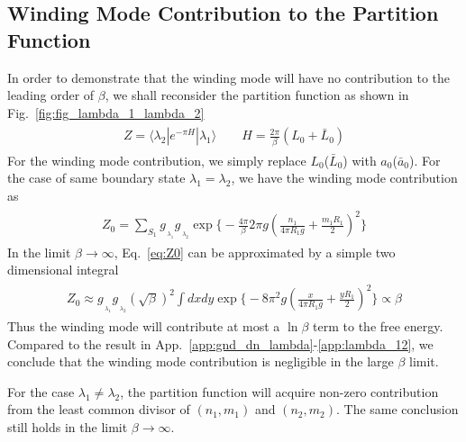 \subsection{Winding Mode Contribution to the Partition Function}
\label{app_sub:winding_contribution}
In order to demonstrate that the winding mode will have no contribution to the leading order of $\beta$, we shall reconsider the partition function as shown in Fig.~\ref{fig:fig_lambda_1_lambda_2}
\begin{eqnarray}\begin{aligned}
Z=\langle\lambda_2|e^{-\pi H}|\lambda_1\rangle\qquad H=\frac{2\pi}{\beta}(L_0+\bar{L}_0)
\end{aligned}\end{eqnarray}
For the winding mode contribution, we simply replace $L_0$($\bar{L}_0$) with $a_0$($\bar{a}_0$). For the case of same boundary state $\lambda_1=\lambda_2$, we have the winding mode contribution as
\begin{eqnarray}\begin{aligned}
\label{eq:Z0}
Z_0 = \sum_{S_1 } g_{\,\!_{\lambda_1} }g_{\,\!_{\lambda_2} } \exp\Big\{- \frac{4\pi}{\beta} 2 \pi g ( \frac{n_1}{ 4 \pi R_1 g} + \frac{m_1 R_1 }{ 2} )^2 \Big\}
\end{aligned}\end{eqnarray}
In the limit $\beta\rightarrow\infty$, Eq.~\eqref{eq:Z0} can be approximated by a simple two dimensional integral
\begin{eqnarray}\begin{aligned}
Z_0\approx g_{\,\!_{\lambda_1} }g_{\,\!_{\lambda_2} } (\sqrt{\beta})^2\int dxdy\exp\Big\{-8 \pi^2 g ( \frac{x}{ 4 \pi R_1 g} + \frac{y R_1 }{ 2} )^2 \Big\}\propto\beta
\end{aligned}\end{eqnarray}
Thus the winding mode will contribute at most a $\ln\beta$ term to the free energy. Compared to the result in App.~\ref{app:gnd_dn_lambda}-\ref{app:lambda_12}, we conclude that the winding mode contribution is negligible in the large $\beta$ limit. 

For the case $\lambda_1\neq\lambda_2$, the partition function will acquire non-zero contribution from the least common divisor of $(n_1,m_1)$ and $(n_2,m_2)$. The same conclusion still holds in the limit $\beta\rightarrow\infty$. 
